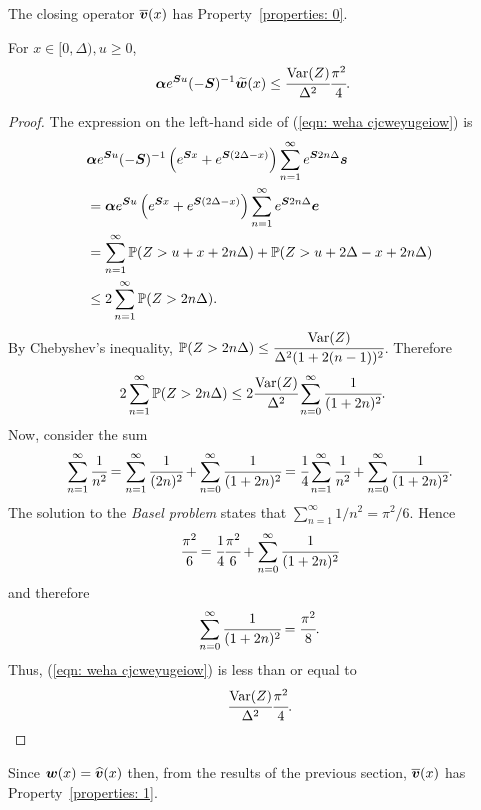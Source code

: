 \begin{lem}\label{lem: akxnj2}
	The closing operator \(\overline{\boldsymbol v}(x)\) has Property~\ref{properties: 0}.

	For \(x\in[0,\Delta),u\geq 0\),  
        \begin{align}
        		\boldsymbol \alpha   e^{\boldsymbol Su}(-\boldsymbol S)^{-1} \widetilde{\boldsymbol w}(x) &\leq \cfrac{\mathrm{Var}(Z)}{\Delta^2}\cfrac{\pi^2}{4}.\label{eqn: weha cjcweyugeiow}
	\end{align}
\end{lem}
\begin{proof}
	The expression on the left-hand side of (\ref{eqn: weha cjcweyugeiow}) is 
	\begin{align*}
		&\boldsymbol \alpha e^{\boldsymbol Su}(-\boldsymbol S)^{-1} \left(e^{\boldsymbol{S} x} + e^{\boldsymbol{S} (2\Delta-x)}\right)\sum_{n=1}^\infty e^{\boldsymbol S  2n\Delta} \boldsymbol s
		\\&= \boldsymbol \alpha e^{\boldsymbol Su} \left(e^{\boldsymbol{S} x} + e^{\boldsymbol{S} (2\Delta-x)}\right)\sum_{n=1}^\infty e^{\boldsymbol S  2n\Delta} \boldsymbol e
		\\&=\sum_{n=1}^\infty \mathbb P(Z>u+x+2n\Delta) + \mathbb P(Z>u+2\Delta-x+2n\Delta)
		\\&\leq 2 \sum_{n=1}^\infty \mathbb P(Z>2n\Delta).
	\end{align*}
	By Chebyshev's inequality, \(\mathbb P(Z>2n\Delta)\leq \cfrac{\mathrm{Var}(Z)}{\Delta^2(1+2(n-1))^2}\). Therefore
	\begin{align}
		2 \sum_{n=1}^\infty \mathbb P(Z>2n\Delta)
		& \leq 2 \cfrac{\mathrm{Var}(Z)}{\Delta^2} \sum_{n=0}^\infty \cfrac{1}{(1+2n)^2}.
	\end{align}
	Now, consider the sum 
	\begin{align}
		\sum_{n=1}^\infty \cfrac{1}{n^2} = \sum_{n=1}^\infty \cfrac{1}{(2n)^2} + \sum_{n=0}^\infty \cfrac{1}{(1+2n)^2} = \cfrac{1}{4}\sum_{n=1}^\infty \cfrac{1}{n^2} + \sum_{n=0}^\infty \cfrac{1}{(1+2n)^2}.
	\end{align}
	The solution to the \emph{Basel problem} states that \(\displaystyle\sum_{n=1}^\infty 1/n^2=\pi^2/6.\) Hence 
	\[\cfrac{\pi^2}{6} = \cfrac{1}{4}\cfrac{\pi^2}{6} + \sum_{n=0}^\infty \cfrac{1}{(1+2n)^2}\]
	and therefore 
	\[\sum_{n=0}^\infty \cfrac{1}{(1+2n)^2} = \cfrac{\pi^2}{8}.\]
	Thus, (\ref{eqn: weha cjcweyugeiow}) is less than or equal to 
	\[\cfrac{\mathrm{Var}(Z)}{\Delta^2}\cfrac{\pi^2}{4}.\]
\end{proof}

Since \(\boldsymbol w(x)=\widehat{\boldsymbol v}(x)\) then, from the results of the previous section, \(\overline{\boldsymbol v}(x)\) has Property~\ref{properties: 1}.

